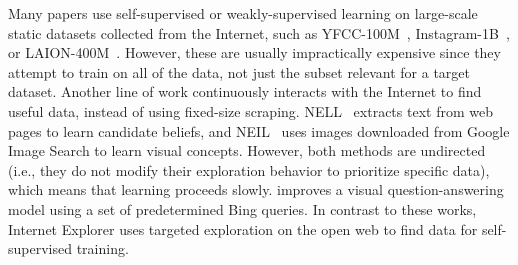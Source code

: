 Many papers use self-supervised or weakly-supervised learning on large-scale static datasets collected from the Internet, such as YFCC-100M~\cite{thomee2015yfcc100m}, Instagram-1B~\cite{mahajan2018exploring}, or LAION-400M~\cite{schuhmann2021laion}. However, these are usually impractically expensive since they attempt to train on all of the data, not just the subset relevant for a target dataset. Another line of work continuously interacts with the Internet to find useful data, instead of using fixed-size scraping. NELL~\cite{carlson2010toward,mitchell2018never} extracts text from web pages to learn candidate beliefs, and NEIL~\cite{chen2013neil} uses images downloaded from Google Image Search to learn visual concepts.
However, both methods are undirected (i.e., they do not modify their exploration behavior to prioritize specific data), which means that learning proceeds slowly.\@ \citet{kamath2022webly} improves a visual question-answering model using a set of predetermined Bing queries. In contrast to these works, Internet Explorer uses targeted exploration on the open web to find data for self-supervised training. 


